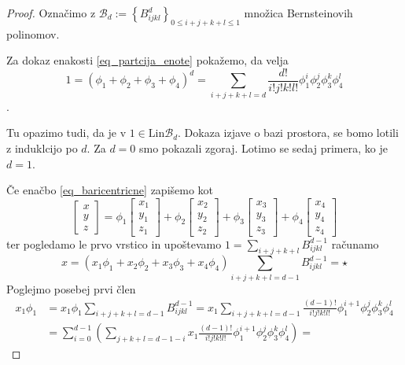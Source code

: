\documentclass[11pt,a4paper]{article}
\begin{document}
\begin{proof}
    Označimo z $\mathcal{B}_d := \left\{ B_{ijkl}^d  \right\}_{0\leq i+j+k+l \leq 1}$ množica
    Bernsteinovih polinomov. 

    Za dokaz enakosti \eqref{eq_partcija_enote} pokažemo, da velja $$1 = \left( \phi_1 + \phi_2 + 
    \phi_3 + \phi_4  \right)^d = \sum_{i+j+k+l = d} \frac{d!}{i!j!k!l!} 
    \phi_1^i \phi_2^j \phi_3^k \phi_4^l$$.

    Tu opazimo tudi, da je v $1 \in \text{Lin} \mathcal{B}_d$. Dokaza izjave
    o bazi prostora, se bomo lotili z induklcijo po $d$. Za $d = 0$ smo pokazali zgoraj. Lotimo
    se sedaj primera, ko je $d = 1$.

    Če enačbo \eqref{eq_baricentricne} zapišemo kot 
    \begin{equation}
        \begin{bmatrix}
            x \\ y \\ z 
        \end{bmatrix} = 
        \phi_1\begin{bmatrix} x_1 \\ y_1 \\ z_1\end{bmatrix} +
        \phi_2\begin{bmatrix} x_2 \\ y_2 \\ z_2\end{bmatrix} +  
        \phi_3\begin{bmatrix} x_3 \\ y_3 \\ z_3\end{bmatrix} +
        \phi_4\begin{bmatrix} x_4 \\ y_4 \\ z_4\end{bmatrix}
    \end{equation}
    ter pogledamo le prvo vrstico in upoštevamo $1 = \sum_{i+j+k+l}B_{ijkl}^{d-1}$ računamo
    $$x = \left(x_1 \phi_1 + x_2 \phi_2 + x_3 \phi_3 +x_4 \phi_4 \right)  \sum_{i+j+k+l = d-1} B_{ijkl}^{d-1} = \star $$
    Poglejmo posebej prvi člen
    \begin{align*}
        x_1 \phi_1 &= x_1 \phi_1 \sum_{i+j+k+l = d-1} B_{ijkl}^{d-1} =  
            x_1  \sum_{i+j+k+l = d-1} \frac{(d-1)!}{i!j!k!l!} \phi_1^{i+1} \phi_2^j \phi_3^k \phi_4^l 
            \\ & = \sum_{i = 0}^{d-1} \left(\sum_{j+k+l = d-1-i} x_1 \frac{(d-1)!}{i!j!k!l!} \phi_1^{i+1} \phi_2^j \phi_3^k \phi_4^l \right) = 

\end{align*}
\end{proof}
\end{document}
